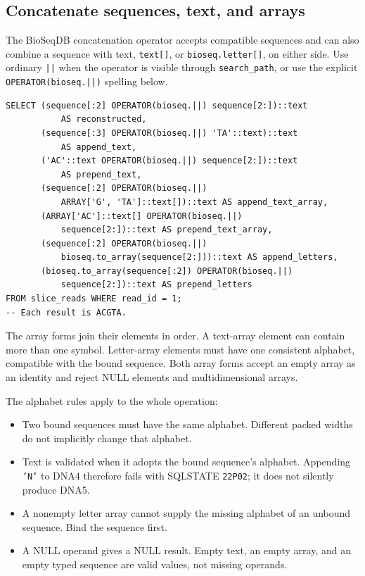 \subsection{Concatenate sequences, text, and arrays}

The BioSeqDB concatenation operator accepts compatible sequences and can
also combine a sequence with text, \texttt{text[]}, or
\texttt{bioseq.letter[]}, on either side. Use ordinary \texttt{||} when
the operator is visible through \texttt{search\_path}, or use the explicit
\texttt{OPERATOR(bioseq.||)} spelling below.

\par\noindent\begin{minipage}{\linewidth}
\begin{lstlisting}[style=bioseq-appendix-sql]
SELECT (sequence[:2] OPERATOR(bioseq.||) sequence[2:])::text
           AS reconstructed,
       (sequence[:3] OPERATOR(bioseq.||) 'TA'::text)::text
           AS append_text,
       ('AC'::text OPERATOR(bioseq.||) sequence[2:])::text
           AS prepend_text,
       (sequence[:2] OPERATOR(bioseq.||)
           ARRAY['G', 'TA']::text[])::text AS append_text_array,
       (ARRAY['AC']::text[] OPERATOR(bioseq.||)
           sequence[2:])::text AS prepend_text_array,
       (sequence[:2] OPERATOR(bioseq.||)
           bioseq.to_array(sequence[2:]))::text AS append_letters,
       (bioseq.to_array(sequence[:2]) OPERATOR(bioseq.||)
           sequence[2:])::text AS prepend_letters
FROM slice_reads WHERE read_id = 1;
-- Each result is ACGTA.
\end{lstlisting}
\end{minipage}

The array forms join their elements in order. A text-array element can
contain more than one symbol. Letter-array elements must have one consistent
alphabet, compatible with the bound sequence. Both array forms accept an
empty array as an identity and reject NULL elements and multidimensional
arrays.

The alphabet rules apply to the whole operation:
\begin{itemize}
  \item Two bound sequences must have the same alphabet. Different packed
    widths do not implicitly change that alphabet.
  \item Text is validated when it adopts the bound sequence's alphabet.
    Appending \texttt{'N'} to DNA4 therefore fails with SQLSTATE
    \texttt{22P02}; it does not silently produce DNA5.
  \item A nonempty letter array cannot supply the missing alphabet of an
    unbound sequence. Bind the sequence first.
  \item A NULL operand gives a NULL result. Empty text, an empty array, and
    an empty typed sequence are valid values, not missing operands.
\end{itemize}

